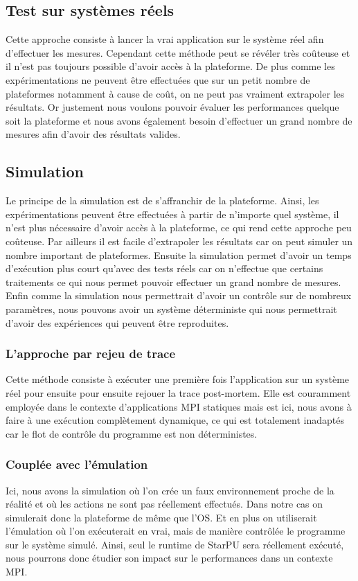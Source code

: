 \documentclass[smallextended]{svjour3}
\begin{document}
\subsection{Test sur systèmes réels}
\label{sec-2-1}
Cette approche consiste à lancer la vrai application sur le système
réel afin d'effectuer les mesures. Cependant cette méthode peut se 
révéler très coûteuse et il n'est pas toujours possible d'avoir
accès à la plateforme. De plus comme les expérimentations ne
peuvent être effectuées que sur un petit nombre de plateformes
notamment à cause de coût, on ne peut pas vraiment extrapoler les
résultats. Or justement nous voulons pouvoir évaluer les
performances quelque soit la plateforme et nous avons également
besoin d'effectuer un grand nombre de mesures afin d'avoir des
résultats valides.
\subsection{Simulation}
\label{sec-2-2}
Le principe de la simulation est de s'affranchir de la plateforme.
Ainsi, les expérimentations peuvent être effectuées à partir de
n'importe quel système, il n'est plus nécessaire d'avoir accès à la
plateforme, ce qui rend cette approche peu coûteuse. 
Par ailleurs il est facile d'extrapoler les résultats car on peut
simuler un nombre important de plateformes. Ensuite la simulation
permet d'avoir un temps d'exécution plus court qu'avec des tests
réels car on n'effectue que certains traitements ce qui nous permet
pouvoir effectuer un grand nombre de mesures.  
Enfin comme la simulation nous permettrait d'avoir un contrôle sur
de nombreux paramètres, nous pouvons avoir un système déterministe qui
nous permettrait d'avoir des expériences qui peuvent être reproduites.

\subsubsection{L'approche par rejeu de trace}
\label{sec-2-2-1}
Cette méthode consiste à exécuter une première fois l'application
sur un système réel pour ensuite pour ensuite rejouer la trace
post-mortem. Elle est couramment employée dans le contexte 
d'applications MPI statiques mais est ici, nous avons à faire à une
exécution complètement dynamique, ce qui est totalement inadaptés car
le flot de contrôle du programme est non déterministes. 
\subsubsection{Couplée avec l'émulation}
\label{sec-2-2-2}
Ici, nous avons la simulation où l'on crée un faux environnement
proche de la réalité et où les actions ne sont pas réellement 
effectués. Dans notre cas on simulerait donc la plateforme de même
que l'OS. Et en plus on utiliserait l'émulation où l'on exécuterait en
vrai, mais de manière contrôlée le programme sur le système
simulé. Ainsi, seul le runtime de StarPU sera réellement
exécuté\cite{StarPUSG}, nous pourrons donc étudier son impact sur
le performances dans un contexte MPI. 
\end{document}
